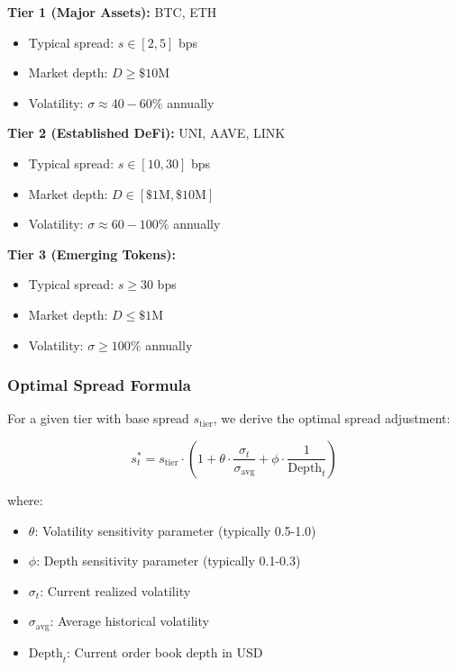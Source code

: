 \documentclass[11pt,a4paper]{article}
\theoremstyle{definition}
\begin{document}
\textbf{Tier 1 (Major Assets):} BTC, ETH
\begin{itemize}
    \item Typical spread: $s \in [2, 5]$ bps
    \item Market depth: $D \geq \$10$M
    \item Volatility: $\sigma \approx 40-60\%$ annually
\end{itemize}

\textbf{Tier 2 (Established DeFi):} UNI, AAVE, LINK
\begin{itemize}
    \item Typical spread: $s \in [10, 30]$ bps
    \item Market depth: $D \in [\$1\text{M}, \$10\text{M}]$
    \item Volatility: $\sigma \approx 60-100\%$ annually
\end{itemize}

\textbf{Tier 3 (Emerging Tokens):}
\begin{itemize}
    \item Typical spread: $s \geq 30$ bps
    \item Market depth: $D \leq \$1\text{M}$
    \item Volatility: $\sigma \geq 100\%$ annually
\end{itemize}

\subsubsection{Optimal Spread Formula}

For a given tier with base spread $s_{\text{tier}}$, we derive the optimal spread adjustment:

\begin{equation}
s_t^* = s_{\text{tier}} \cdot \left(1 + \theta \cdot \frac{\sigma_t}{\sigma_{\text{avg}}} + \phi \cdot \frac{1}{\text{Depth}_t}\right)
\end{equation}

where:
\begin{itemize}
    \item $\theta$: Volatility sensitivity parameter (typically 0.5-1.0)
    \item $\phi$: Depth sensitivity parameter (typically 0.1-0.3)
    \item $\sigma_t$: Current realized volatility
    \item $\sigma_{\text{avg}}$: Average historical volatility
    \item $\text{Depth}_t$: Current order book depth in USD
\end{itemize}
\end{document}
